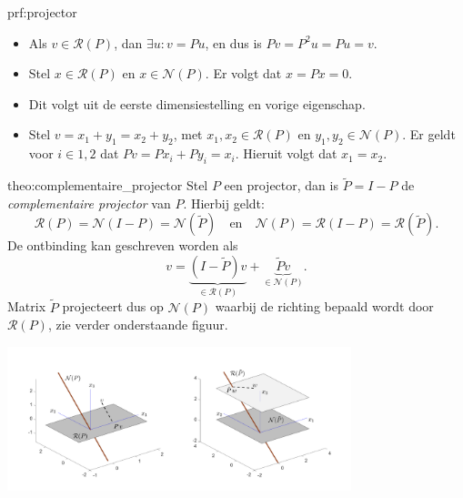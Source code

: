 \begin{prf}[Projector]{prf:projector}
    \begin{itemize}
        \item Als $v \in \mathcal{R}(P)$, dan $\exists u: v = Pu$, en dus is $Pv = P^2u = Pu = v$.
        \item Stel $x \in \mathcal{R}(P)$ en $x \in \mathcal{N}(P)$. Er volgt dat $x = Px = 0$.
        \item Dit volgt uit de eerste dimensiestelling en vorige eigenschap.
        \item Stel $v = x_1 + y_1 = x_2 + y_2$, met $x_1, x_2 \in \mathcal{R}(P)$ en $y_1, y_2 \in \mathcal{N}(P)$. Er geldt voor $i \in {1,2}$ dat $Pv = Px_i + Py_i = x_i$. Hieruit volgt dat $x_1 = x_2$.
    \end{itemize}
\end{prf}

\begin{theo}{theo:complementaire_projector}
    Stel $P$ een projector, dan is $\tilde{P} = I - P$ de \emph{complementaire projector} van $P$. Hierbij geldt:
    \begin{equation*}
        \mathcal{R}(P) = \mathcal{N}(I-P) = \mathcal{N}(\tilde{P})  \quad \text{en} \quad \mathcal{N}(P) = \mathcal{R}(I-P) = \mathcal{R}(\tilde{P}).
    \end{equation*}
    De ontbinding kan geschreven worden als 
    \begin{equation*}
        v = \underbrace{(I - \tilde{P})v}_{\in \mathcal{R}(P)} + \underbrace{\tilde{P}v}_{\in \mathcal{N}(P)}.
    \end{equation*}
    Matrix $\tilde{P}$ projecteert dus op $\mathcal{N}(P)$ waarbij de richting bepaald wordt door $\mathcal{R}(P)$, zie verder onderstaande figuur.
    \begin{center}
        \includegraphics[width=0.75\textwidth]{Images/projectorencomplementaireprojector.png}
    \end{center}
\end{theo}

\newpage


